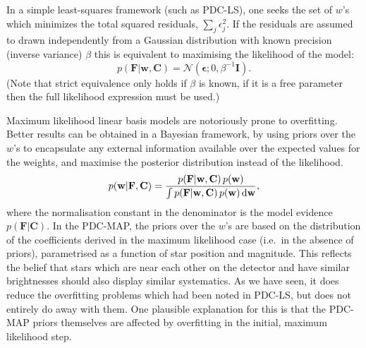 \documentclass[useAMS,usenatbib]{mn2e}
\begin{document}
In a simple least-squares framework (such as PDC-LS), one seeks the
set of $w$'s which minimizes the total squared residuals, $
\sum_j \epsilon_j^2 $. If the residuals are assumed to drawn
independently from a Gaussian distribution with known precision (inverse
variance) $\beta$ this is equivalent to
maximising the likelihood of the model:
\begin{equation}
p(\mathbf{F}|\mathbf{w},\mathbf{C}) =
\mathcal{N}(\boldsymbol{\epsilon};0,\beta^{-1} \mathbf{I}).
\end{equation}
(Note that strict equivalence only holds if $\beta$ is known, if it is
a free parameter then the full likelihood expression must be used.)

Maximum likelihood linear basis models are notoriously prone
to overfitting. Better results can be obtained in a Bayesian
framework, by using
priors over the $w$'s to encapsulate any external information
available over the expected values for the weights, and maximise the
posterior distribution instead of the likelihood. 
\begin{equation}
p(\mathbf{w}|\mathbf{F},\mathbf{C}) =
\frac{p(\mathbf{F}|\mathbf{w},\mathbf{C})  \, p(\mathbf{w})}{\int
  p(\mathbf{F}|\mathbf{w},\mathbf{C}) \, p(\mathbf{w}) \, {\rm d}\mathbf{w}},
\end{equation} 
where the normalisation constant in the denominator is the model
evidence $p(\mathbf{F}|\mathbf{C})$. In the PDC-MAP, the priors over
the $w$'s are based on the distribution of the coefficients derived in
the maximum likelihood case (i.e.\ in the absence of priors),
parametrised as a function of star position and magnitude. This
reflects the belief that stars which are near each other on the
detector and have similar brightnesses should also display similar
systematics. As we have seen, it does reduce the overfitting problems
which had been noted in PDC-LS, but does not entirely do away with
them. One plausible explanation for this is that the PDC-MAP priors
themselves are affected by overfitting in the initial, maximum
likelihood step. 
\end{document}
